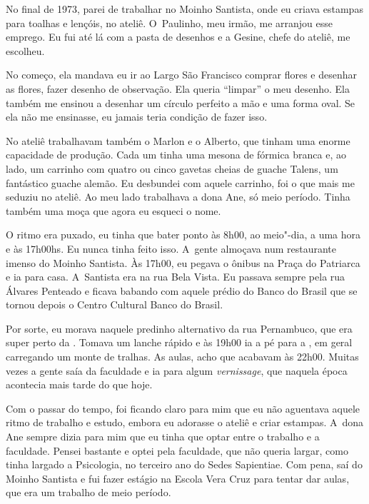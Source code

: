 No final de 1973, parei de trabalhar no Moinho Santista, onde eu criava
estampas para toalhas e lençóis, no ateliê. O~Paulinho, meu irmão, me
arranjou esse emprego. Eu fui até lá com a pasta de desenhos e a Gesine,
chefe do ateliê, me escolheu.

No começo, ela mandava eu ir ao Largo São Francisco comprar flores e
desenhar as flores, fazer desenho de observação. Ela queria ``limpar'' o
meu desenho. Ela também me ensinou a desenhar um círculo perfeito a mão
e uma forma oval. Se ela não me ensinasse, eu jamais teria condição de
fazer isso.

No ateliê trabalhavam também o Marlon e o Alberto, que tinham uma enorme
capacidade de produção. Cada um tinha uma mesona de fórmica branca e, ao
lado, um carrinho com quatro ou cinco gavetas cheias de guache Talens,
um fantástico guache alemão. Eu desbundei com aquele carrinho, foi o que
mais me seduziu no ateliê. Ao meu lado trabalhava a dona Ane, só meio
período. Tinha também uma moça que agora eu esqueci o nome.

O ritmo era puxado, eu tinha que bater ponto às 8h00, ao meio"-dia, a uma
hora e às 17h00hs. Eu nunca tinha feito isso. A~gente almoçava num
restaurante imenso do Moinho Santista. Às 17h00, eu pegava o ônibus na
Praça do Patriarca e ia para casa. A~Santista era na rua Bela Vista. Eu
passava sempre pela rua Álvares Penteado e ficava babando com aquele
prédio do Banco do Brasil que se tornou depois o Centro Cultural Banco
do Brasil.

Por sorte, eu morava naquele predinho alternativo da rua Pernambuco, que
era super perto da . Tomava um lanche rápido e às 19h00 ia a pé para
a , em geral carregando um monte de tralhas. As aulas, acho que
acabavam às 22h00. Muitas vezes a gente saía da faculdade e ia para
algum \emph{vernissage}, que naquela época acontecia mais tarde do que
hoje.

Com o passar do tempo, foi ficando claro para mim que eu não aguentava
aquele ritmo de trabalho e estudo, embora eu adorasse o ateliê e criar
estampas. A~dona Ane sempre dizia para mim que eu tinha que optar entre
o trabalho e a faculdade. Pensei bastante e optei pela faculdade, que
não queria largar, como tinha largado a Psicologia, no terceiro ano do
Sedes Sapientiae. Com pena, saí do Moinho Santista e fui fazer estágio
na Escola Vera Cruz para tentar dar aulas, que era um trabalho de meio
período.


